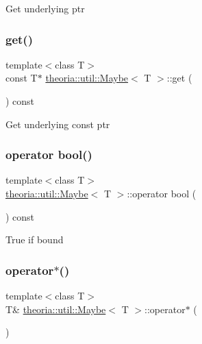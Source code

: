 Get underlying ptr \mbox{\label{classtheoria_1_1util_1_1Maybe_aee0adf6d385b3120f9d91267c2ddf513}} 
\subsubsection{\texorpdfstring{get()}{get()}\hspace{0.1cm}{\footnotesize\ttfamily [2/2]}}
{\footnotesize\ttfamily template$<$class T$>$ \\
const T$\ast$ \hyperlink{classtheoria_1_1util_1_1Maybe}{theoria\+::util\+::\+Maybe}$<$ T $>$\+::get (\begin{DoxyParamCaption}{ }\end{DoxyParamCaption}) const\hspace{0.3cm}{\ttfamily [inline]}}

Get underlying const ptr \mbox{\label{classtheoria_1_1util_1_1Maybe_aa88cfe148c9279e1ed6de5ed145d6e23}} 
\subsubsection{\texorpdfstring{operator bool()}{operator bool()}}
{\footnotesize\ttfamily template$<$class T$>$ \\
\hyperlink{classtheoria_1_1util_1_1Maybe}{theoria\+::util\+::\+Maybe}$<$ T $>$\+::operator bool (\begin{DoxyParamCaption}{ }\end{DoxyParamCaption}) const\hspace{0.3cm}{\ttfamily [inline]}}

True if bound \mbox{\label{classtheoria_1_1util_1_1Maybe_abe504b965167614138072fe5d227f3f6}} 
\subsubsection{\texorpdfstring{operator$\ast$()}{operator*()}\hspace{0.1cm}{\footnotesize\ttfamily [1/2]}}
{\footnotesize\ttfamily template$<$class T$>$ \\
T\& \hyperlink{classtheoria_1_1util_1_1Maybe}{theoria\+::util\+::\+Maybe}$<$ T $>$\+::operator$\ast$ (\begin{DoxyParamCaption}{ }\end{DoxyParamCaption})\hspace{0.3cm}{\ttfamily [inline]}}

